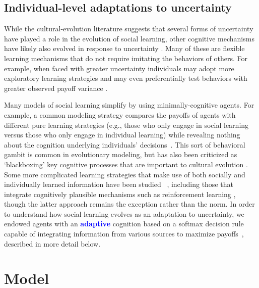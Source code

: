 \documentclass[letterpaper,11.5pt]{scrartcl}
\newcommand{\edit}[1]{{\bfseries \textcolor{blue} {#1}}}
\begin{document}


\subsection{Individual-level adaptations to uncertainty} 

While the cultural-evolution literature suggests that several forms of uncertainty have played a role in the evolution of social learning, other cognitive mechanisms have likely also evolved in response to uncertainty \citep{volz2012,johnson2013evolution,van2018uncertainty}. Many of these are flexible learning mechanisms that do not require imitating the behaviors of others. For example, when faced with greater uncertainty individuals may adopt more exploratory learning strategies and may even preferentially test behaviors with greater observed payoff variance \citep{Wilson2014,Gershman2019}.

Many models of social learning simplify by using minimally-cognitive agents. For example, a common modeling strategy compares the payoffs of agents with different pure learning strategies (e.g., those who only engage in social learning versus those who only engage in individual learning) while revealing nothing about the cognition underlying individuals' decisions~\citep{BoydRicherson1985, Rogers1988, 
aoki2005}. This sort of behavioral gambit is common in evolutionary modeling, but has also been criticized as `blackboxing' key cognitive processes that are important to cultural evolution \citep{Heyes2016,Kendal2018}.  
Some more complicated learning strategies that make use of both socially and
individually learned information have been studied ~\citep{Enquist2007,
perreault2012bayesian}, including those that integrate cognitively plausible
mechanisms such as reinforcement learning \citep{lindstrom2016co}, though the latter
approach remains the exception rather than the norm. In order to understand how
social learning evolves as an adaptation to uncertainty, we endowed agents with an
\edit{adaptive} cognition based on a softmax decision rule capable of integrating information from various sources to maximize payoffs~\citep{Gershman2019}, described in more detail below. 

\section{Model}
\end{document}
